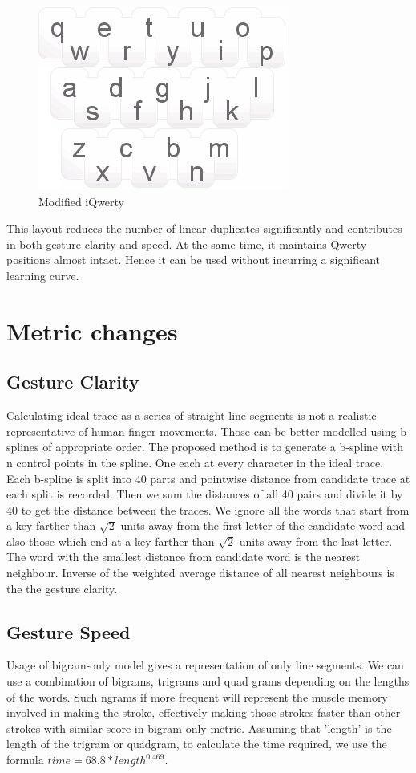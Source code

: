 \documentclass[MTech]{iitmdiss}
\begin{document}
\begin{figure}[h!]
	\centering
	\includegraphics[scale=1]{Images/iqmod}
	\caption{Modified iQwerty}
\end{figure}


This layout reduces the number of linear duplicates significantly and contributes in both gesture clarity and speed. At the same time, it maintains Qwerty positions almost intact. Hence it can be used without incurring a significant learning curve.

\section{Metric changes}
\subsection{Gesture Clarity}
Calculating ideal trace as a series of straight line segments is not a realistic representative of human finger movements. Those can be better modelled using b-splines of appropriate order.
The proposed method is to generate a b-spline with n control points in the spline. One each at every character in the ideal trace. Each b-spline is split into 40 parts and pointwise distance from candidate trace at each split is recorded. Then we sum the distances of all 40 pairs and divide it by 40 to get the distance between the traces. We ignore all the words that start from a key farther than $\sqrt{2}$ units away from the first letter of the candidate word and also those which end at a key farther than $\sqrt{2}$ units away from the last letter. The word with the smallest distance from candidate word is the nearest neighbour. Inverse of the weighted average distance of all nearest neighbours is the the gesture clarity.

\subsection{Gesture Speed}
Usage of bigram-only model gives a representation of only line segments. We can use a combination of bigrams, trigrams and quad grams depending on the lengths of the words.
Such ngrams if more frequent will represent the muscle memory involved in making the stroke, effectively making those strokes faster than other strokes with similar score in bigram-only metric. Assuming that 'length' is the length of the trigram or quadgram, to calculate the time required, we use the formula $ time = 68.8 * length^{0.469} $. \cite{strokes}
\end{document}
